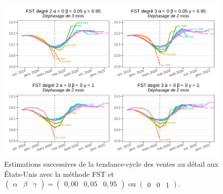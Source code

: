 \documentclass[
  12pt,
  a4paper,french]{article}
\newcommand\1{\mathds{1}}
\begin{document}
\begin{figure}

{\centering \includegraphics[width=0.9\linewidth]{img/nber/retailx_fstp2} 

}

\caption[Estimations successives de la tendance-cycle des ventes au détail aux États-Unis avec la méthode FST et \(\begin{pmatrix}\alpha&\beta&\gamma\end{pmatrix} =\begin{pmatrix}0,00 &0,05&0,95\end{pmatrix}\) ou \(\begin{pmatrix}0 &0&1\end{pmatrix}\)]{Estimations successives de la tendance-cycle des ventes au détail aux États-Unis avec la méthode FST et \(\begin{pmatrix}\alpha&\beta&\gamma\end{pmatrix} =\begin{pmatrix}0,00 &0,05&0,95\end{pmatrix}\) ou \(\begin{pmatrix}0 &0&1\end{pmatrix}\).}\label{fig:retailxfst2}

\footnotesize
\normalsize\end{figure}
\end{document}
